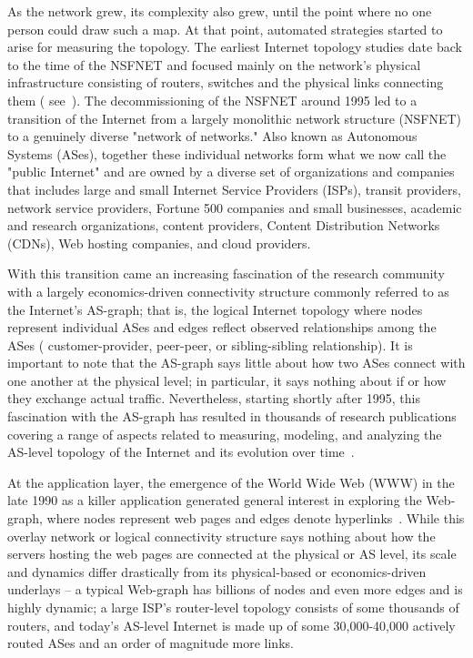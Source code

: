 As the network grew, its complexity also grew, until the point where
no one person could draw such a map. At that point, automated
strategies started to arise for measuring the topology. The earliest
Internet topology studies date back to the time of the
NSFNET and focused mainly on the network's physical
infrastructure consisting of routers, switches and the physical links
connecting them (\eg
see~\cite{Calvert97,pansiot98:_inter}). The decommissioning of
the NSFNET around 1995 led to a transition of the Internet from a
largely monolithic network structure (\ie NSFNET) to a genuinely
diverse "network of networks."  Also known as Autonomous Systems
(ASes), together these individual networks form what we now call the
"public Internet" and are owned by a diverse set of organizations
and companies that includes large and small Internet Service Providers
(ISPs), transit providers, network service providers, Fortune 500
companies and small businesses, academic and research organizations,
content providers, Content Distribution Networks (CDNs), Web hosting
companies, and cloud providers.

With this transition came an increasing fascination of the research
community with a largely economics-driven connectivity structure
commonly referred to as the Internet's AS-graph; that is, the logical
Internet topology where nodes represent individual ASes and edges
reflect observed relationships among the ASes (\eg
customer-provider, peer-peer, or sibling-sibling relationship). It is
important to note that the AS-graph says little about
how two ASes connect with one another at the physical level; in
particular, it says nothing about if or how they exchange actual
traffic.  Nevertheless, starting shortly after 1995, this fascination
with the AS-graph has resulted in thousands of research publications
covering a range of aspects related to measuring, modeling, and
analyzing the AS-level topology of the Internet and its evolution over
time~\cite{govindan97:_topology,roughan11}.

At the application layer, the emergence of the World Wide Web (WWW) in
the late 1990 as a killer application generated general interest in
exploring the Web-graph, where nodes represent web pages and edges
denote hyperlinks~\cite{Broder:2000:GSW:346241.346290}. While this overlay network
or logical connectivity structure says nothing about how the servers
hosting the web pages are connected at the physical or AS level, its
scale and dynamics differ drastically from its physical-based or
economics-driven underlays -- a typical Web-graph has billions of
nodes and even more edges and is highly dynamic; a large ISP's
router-level topology consists of some thousands of routers, and
today's AS-level Internet is made up of some 30,000-40,000 actively
routed ASes and an order of magnitude more links.


